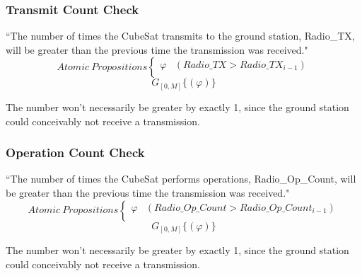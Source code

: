 \subsubsection{\textbf{Transmit Count Check}}
“The number of times the CubeSat transmits to the ground station, Radio\_TX, will be greater than the previous time the transmission was received."
\[ Atomic\:Propositions \begin{cases}
  \varphi & (Radio\_TX > Radio\_TX_{i-1})\\
\end{cases} \]
\begin{equation}
    \label{Spec 11}
    G_{[0,M]} \{(\varphi)\}
\end{equation} 

The number won't necessarily be greater by exactly 1, since the ground station could conceivably not receive a transmission.

\subsubsection{\textbf{Operation Count Check}}
“The number of times the CubeSat performs operations, Radio\_Op\_Count, will be greater than the previous time the transmission was received."
\[ Atomic\:Propositions \begin{cases}
  \varphi & (Radio\_Op\_Count > Radio\_Op\_Count_{i-1})\\
\end{cases} \]
\begin{equation}
    \label{Spec 12}
    G_{[0,M]} \{(\varphi)\}
\end{equation} 

The number won't necessarily be greater by exactly 1, since the ground station could conceivably not receive a transmission.

\begin{comment}
\subsubsection{\textbf{Spacecraft Attitude Bounds}}
“The orientation angles X,Y,Z measured by the spacecraft sensors shall be bounded between 0 and 360 degrees in all instances."
\[ Atomic\:Propositions \begin{cases}
  \varphi_1 & (X $\geq$ 0) \\
  \varphi_2 & (Y $\geq$ 0) \\
  \varphi_2 & (Z $\geq$ 0) \\
  \psi_1 & (X $\leq$ 360) \\
  \psi_2 & (Y $\leq$ 360) \\
  \psi_2 & (Z $\leq$ 360) \\
\end{cases} \]
\begin{equation}
    \label{Spec 13}
    G_{[0,M]} \{(\varphi_1 \wedge \psi_1) \wedge (\varphi_2 \wedge \psi_2) \wedge (\varphi_3 \wedge \psi_3)\}
\end{equation} 
\end{comment}
